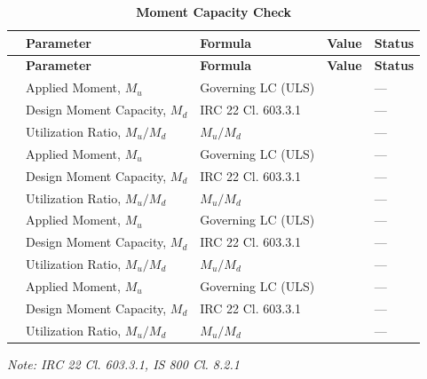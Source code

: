 \documentclass[12pt,a4paper]{report}
\numberwithin{table}{chapter}
\numberwithin{figure}{chapter}
\newcommand{\reportrowpad}{4pt}
\newcommand{\reportsectiongap}{0.75em}
\begin{document}
\vspace{\reportsectiongap}
\begin{longtable}{|C{2.5cm}|C{3.5cm}|C{3.5cm}|>{\centering\arraybackslash}p{4.2cm}|C{1.8cm}|}
\caption{\textbf{Moment Capacity Check}}\\
\hline
\textbf{} & \textbf{Parameter} & \textbf{Formula} & \textbf{Value} & \textbf{Status} \\[\reportrowpad]
\hline
\endfirsthead
\hline
\textbf{} & \textbf{Parameter} & \textbf{Formula} & \textbf{Value} & \textbf{Status} \\[\reportrowpad]
\hline
\endhead
{} & Applied Moment, $M_u$ & Governing LC (ULS) &  & --- \\[\reportrowpad]
 & Design Moment Capacity, $M_d$ & IRC 22 Cl. 603.3.1 &  & --- \\[\reportrowpad]
 & Utilization Ratio, $M_u / M_d$ & $M_u / M_d$ &  & --- \\[\reportrowpad]
\hline
{} & Applied Moment, $M_u$ & Governing LC (ULS) &  & --- \\[\reportrowpad]
 & Design Moment Capacity, $M_d$ & IRC 22 Cl. 603.3.1 &  & --- \\[\reportrowpad]
 & Utilization Ratio, $M_u / M_d$ & $M_u / M_d$ &  & --- \\[\reportrowpad]
\hline
{} & Applied Moment, $M_u$ & Governing LC (ULS) &  & --- \\[\reportrowpad]
 & Design Moment Capacity, $M_d$ & IRC 22 Cl. 603.3.1 &  & --- \\[\reportrowpad]
 & Utilization Ratio, $M_u / M_d$ & $M_u / M_d$ &  & --- \\[\reportrowpad]
\hline
{} & Applied Moment, $M_u$ & Governing LC (ULS) &  & --- \\[\reportrowpad]
 & Design Moment Capacity, $M_d$ & IRC 22 Cl. 603.3.1 &  & --- \\[\reportrowpad]
 & Utilization Ratio, $M_u / M_d$ & $M_u / M_d$ &  & --- \\[\reportrowpad]
\hline
\end{longtable}
\noindent\textit{Note: IRC 22 Cl. 603.3.1, IS 800 Cl. 8.2.1}
\end{document}
